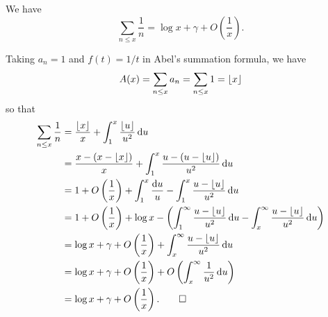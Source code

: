 \begin{thm}
We have 
\[ \sum_{n \leq x} \frac1n = \log x + \gamma + O
\left( \frac1x \right). \]
\end{thm}
\begin{pf}
Taking $a_n = 1$ and $f(t) = 1/t$ in Abel's summation formula,
we have 
\[ A(x) = \sum_{n\leq x} a_n = \sum_{n \leq x} 1 = \lfloor x\rfloor \]
so that 
\begin{align*}
    \sum_{n\leq x} \frac1n &= \frac{\lfloor x\rfloor}{x} + \int_1^x \frac{\lfloor u\rfloor}{u^2}\,\mathrm{d} u \\
    &= \frac{x - (x - \lfloor x\rfloor)}{x} + \int_1^x \frac{u - (u - \lfloor u\rfloor)}{u^2}\,\mathrm{d} u \\
    &= 1 + O\left(\frac1x\right) + \int_1^x \frac{{\rm d}u}u -
    \int_1^x \frac{u - \lfloor u\rfloor}{u^2}\,\mathrm{d} u \\
    &= 1 + O\left(\frac1x\right) + \log x - \left( \int_1^\infty \frac{u-\lfloor u\rfloor}{u^2}\,\mathrm{d} u - \int_x^\infty \frac{u-\lfloor u\rfloor}{u^2}\,\mathrm{d} u \right) \\
    &= \log x + \gamma + O\left(\frac1x\right) + 
    \int_x^\infty \frac{u-\lfloor u\rfloor}{u^2}\,\mathrm{d} u \\
    &= \log x + \gamma + O\left(\frac1x\right) 
    + O\left(\int_x^\infty \frac1{u^2}\,\mathrm{d} u \right) \\
    &= \log x + \gamma + O\left(\frac1x\right). \qedhere
\end{align*}
\end{pf}

